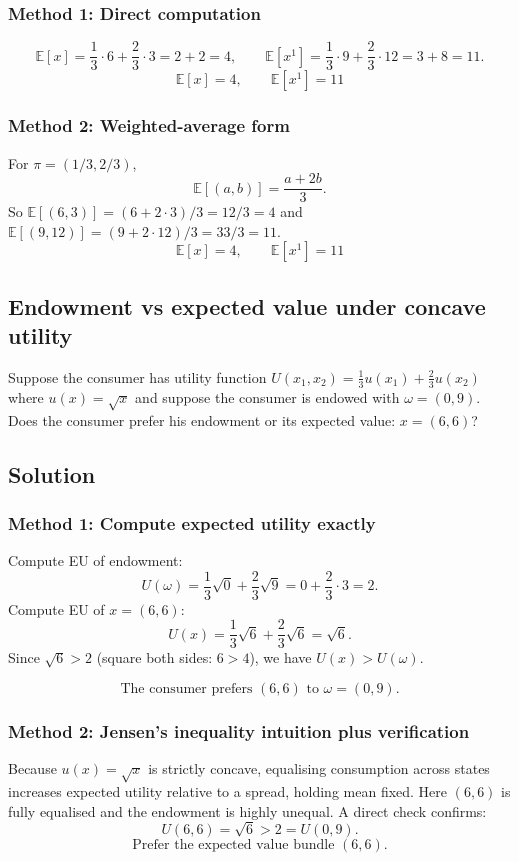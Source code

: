 \documentclass[12pt]{article}
\newcommand{\E}{\mathbb{E}}
\begin{document}
\subsubsection*{Method 1: Direct computation}
\[
\E[x]=\frac13\cdot 6+\frac23\cdot 3=2+2=4,
\qquad
\E[x^{1}]=\frac13\cdot 9+\frac23\cdot 12=3+8=11.
\]
\[
\boxed{\;\E[x]=4,\qquad \E[x^{1}]=11\;}
\]

\subsubsection*{Method 2: Weighted-average form}
For \(\pi=(1/3,2/3)\),
\[
\E[(a,b)]=\frac{a+2b}{3}.
\]
So \(\E[(6,3)]=(6+2\cdot 3)/3=12/3=4\) and \(\E[(9,12)]=(9+2\cdot 12)/3=33/3=11\).
\[
\boxed{\;\E[x]=4,\qquad \E[x^{1}]=11\;}
\]

\subsection{Endowment vs expected value under concave utility}
Suppose the consumer has utility function \(U(x_1,x_2)=\frac13u(x_1)+\frac23u(x_2)\) where \(u(x)=\sqrt{x}\) and suppose the consumer is endowed with \(\omega=(0,9)\). Does the consumer prefer his endowment or its expected value: \(x=(6,6)\)?

\subsection*{Solution}
\subsubsection*{Method 1: Compute expected utility exactly}
Compute EU of endowment:
\[
U(\omega)=\frac13\sqrt{0}+\frac23\sqrt{9}=0+\frac23\cdot 3=2.
\]
Compute EU of \(x=(6,6)\):
\[
U(x)=\frac13\sqrt{6}+\frac23\sqrt{6}=\sqrt{6}.
\]
Since \(\sqrt{6}>2\) (square both sides: \(6>4\)), we have \(U(x)>U(\omega)\).

\[
\boxed{\;\text{The consumer prefers }(6,6)\text{ to }\omega=(0,9).\;}
\]

\subsubsection*{Method 2: Jensen's inequality intuition plus verification}
Because \(u(x)=\sqrt{x}\) is strictly concave, equalising consumption across states increases expected utility relative to a spread, holding mean fixed. Here \((6,6)\) is fully equalised and the endowment is highly unequal. A direct check confirms:
\[
U(6,6)=\sqrt{6}>2=U(0,9).
\]
\[
\boxed{\;\text{Prefer the expected value bundle }(6,6).\;}
\]
\end{document}

